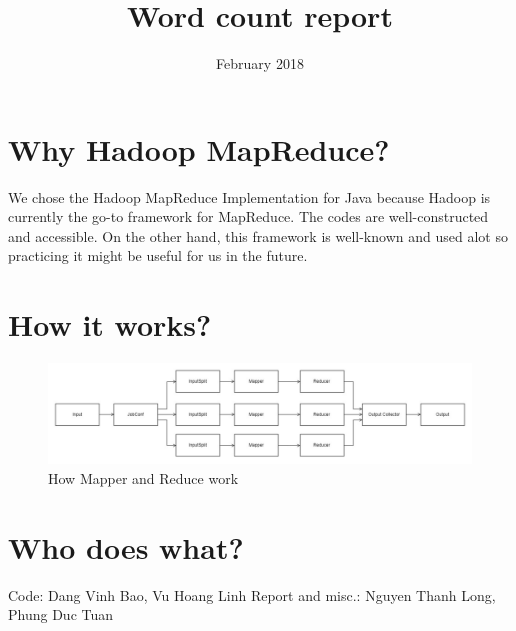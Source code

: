 \documentclass{article}
\title{Word count report}
\date{February 2018}
\begin{document}
\maketitle

\section{Why Hadoop MapReduce?}
We chose the Hadoop MapReduce Implementation for Java because Hadoop is currently the go-to framework for MapReduce. The codes are well-constructed and accessible. On the other hand, this framework is well-known and used alot so practicing it might be useful for us in the future.

\section{How it works?}
\begin{figure}[h!]
\centering
\includegraphics[scale=1.7]{03.mapreduce_flowchart.jpg}
\caption{How Mapper and Reduce work}
\label{fig:mapreducefigure}
\end{figure}

\section{Who does what?}
Code: Dang Vinh Bao, Vu Hoang Linh
Report and misc.: Nguyen Thanh Long, Phung Duc Tuan
\end{document}
